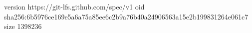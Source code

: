version https://git-lfs.github.com/spec/v1
oid sha256:6b5976ce169e5a6a75a85ee6c2b9a76b40a24906563a15e2b199831264e061c7
size 1398236
